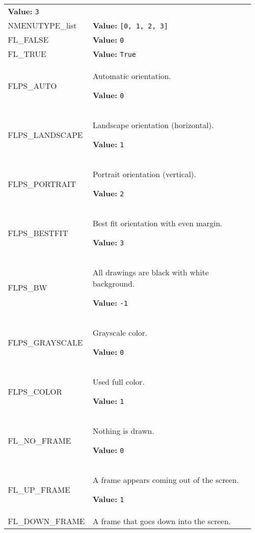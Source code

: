 \begin{longtable}{|p{\varnamewidth}|p{\vardescrwidth}|l}
\textbf{Value:} 
{\tt 3}&\\
\cline{1-2}
\raggedright N\-M\-E\-N\-U\-T\-Y\-P\-E\-\_\-l\-i\-s\-t\- & \raggedright \textbf{Value:} 
{\tt \texttt{[}0\texttt{, }1\texttt{, }2\texttt{, }3\texttt{]}}&\\
\cline{1-2}
\raggedright F\-L\-\_\-F\-A\-L\-S\-E\- & \raggedright \textbf{Value:} 
{\tt 0}&\\
\cline{1-2}
\raggedright F\-L\-\_\-T\-R\-U\-E\- & \raggedright \textbf{Value:} 
{\tt True}&\\
\cline{1-2}
\raggedright F\-L\-P\-S\-\_\-A\-U\-T\-O\- & \raggedright Automatic orientation.

\textbf{Value:} 
{\tt 0}&\\
\cline{1-2}
\raggedright F\-L\-P\-S\-\_\-L\-A\-N\-D\-S\-C\-A\-P\-E\- & \raggedright Landscape  orientation (horizontal).

\textbf{Value:} 
{\tt 1}&\\
\cline{1-2}
\raggedright F\-L\-P\-S\-\_\-P\-O\-R\-T\-R\-A\-I\-T\- & \raggedright Portrait orientation (vertical).

\textbf{Value:} 
{\tt 2}&\\
\cline{1-2}
\raggedright F\-L\-P\-S\-\_\-B\-E\-S\-T\-F\-I\-T\- & \raggedright Best fit orientation with even margin.

\textbf{Value:} 
{\tt 3}&\\
\cline{1-2}
\raggedright F\-L\-P\-S\-\_\-B\-W\- & \raggedright All drawings are black with white background.

\textbf{Value:} 
{\tt -1}&\\
\cline{1-2}
\raggedright F\-L\-P\-S\-\_\-G\-R\-A\-Y\-S\-C\-A\-L\-E\- & \raggedright Grayscale color.

\textbf{Value:} 
{\tt 0}&\\
\cline{1-2}
\raggedright F\-L\-P\-S\-\_\-C\-O\-L\-O\-R\- & \raggedright Used full color.

\textbf{Value:} 
{\tt 1}&\\
\cline{1-2}
\raggedright F\-L\-\_\-N\-O\-\_\-F\-R\-A\-M\-E\- & \raggedright Nothing is drawn.

\textbf{Value:} 
{\tt 0}&\\
\cline{1-2}
\raggedright F\-L\-\_\-U\-P\-\_\-F\-R\-A\-M\-E\- & \raggedright A frame appears coming out of the screen.

\textbf{Value:} 
{\tt 1}&\\
\cline{1-2}
\raggedright F\-L\-\_\-D\-O\-W\-N\-\_\-F\-R\-A\-M\-E\- & \raggedright A frame that goes down into the screen.


\end{longtable}
